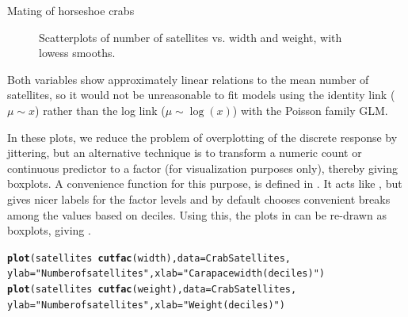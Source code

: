 \documentclass[11pt]{book}\usepackage[]{graphicx}\usepackage[]{color}
\makeatletter
\newcommand{\hlstr}[1]{\textcolor[rgb]{0.192,0.494,0.8}{#1}}%
\newcommand{\hlopt}[1]{\textcolor[rgb]{0,0,0}{#1}}%
\newcommand{\hlstd}[1]{\textcolor[rgb]{0.345,0.345,0.345}{#1}}%
\newcommand{\hlkwc}[1]{\textcolor[rgb]{0.333,0.667,0.333}{#1}}%
\newcommand{\hlkwd}[1]{\textcolor[rgb]{0.737,0.353,0.396}{\textbf{#1}}}%
\newenvironment{kframe}{%
 \def\at@end@of@kframe{}%
 \ifinner\ifhmode%
  \def\at@end@of@kframe{\end{minipage}}%
  \begin{minipage}{\columnwidth}%
 \fi\fi%
 \def\FrameCommand##1{\hskip\@totalleftmargin \hskip-\fboxsep
 \colorbox{shadecolor}{##1}\hskip-\fboxsep
     \hskip-\linewidth \hskip-\@totalleftmargin \hskip\columnwidth}%
 \MakeFramed {\advance\hsize-\width
   \@totalleftmargin\z@ \linewidth\hsize
   \@setminipage}}%
 {\par\unskip\endMakeFramed%
 \at@end@of@kframe}
\newenvironment{knitrout}{}{} %
\renewenvironment{knitrout}{\small\renewcommand{\baselinestretch}{.85}}{} %
\makeatother
\begin{document}
\begin{Example}[crabs1]{Mating of horseshoe crabs}
\begin{knitrout}
\begin{figure}[!htbp]
\caption[Scatterplots of number of satellites vs]{Scatterplots of number of satellites vs. width and weight, with lowess smooths.\label{fig:crabs1-scats}}
\end{figure}


\end{knitrout}
Both variables show approximately linear relations to the mean number of satellites, so it
would not be unreasonable to fit models using the identity link ($\mu \sim x$) rather than the log link
($\mu \sim \log(x)$) with the Poisson family GLM.

In these plots, we reduce the problem of overplotting of the discrete response by jittering, but
an alternative technique is to transform a numeric count or continuous predictor to
a factor (for visualization purposes only), thereby giving boxplots.  A convenience function for
this purpose,  is defined in .  
It acts like , but gives nicer labels
for the factor levels and by default chooses convenient breaks among the values based on deciles.
% 
% 
Using this, the plots in  can be re-drawn as boxplots, giving .

\begin{knitrout}
\color{fgcolor}\begin{kframe}
\begin{alltt}
\hlkwd{plot}\hlstd{(satellites} \hlopt{~} \hlkwd{cutfac}\hlstd{(width),} \hlkwc{data}\hlstd{=CrabSatellites,}
     \hlkwc{ylab}\hlstd{=}\hlstr{"Number of satellites"}\hlstd{,} \hlkwc{xlab}\hlstd{=}\hlstr{"Carapace width (deciles)"}\hlstd{)}
\hlkwd{plot}\hlstd{(satellites} \hlopt{~} \hlkwd{cutfac}\hlstd{(weight),} \hlkwc{data}\hlstd{=CrabSatellites,}
     \hlkwc{ylab}\hlstd{=}\hlstr{"Number of satellites"}\hlstd{,} \hlkwc{xlab}\hlstd{=}\hlstr{"Weight (deciles)"}\hlstd{)}
\end{alltt}
\end{kframe}\begin{figure}[!htbp]



\end{figure}
\end{knitrout}
\end{Example}
\end{document}
